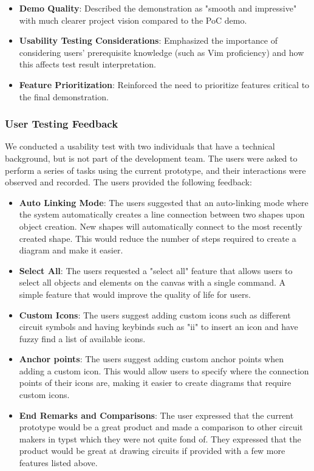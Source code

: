 \documentclass[12pt, titlepage]{article}
\begin{document}
\begin{itemize}
\item \textbf{Demo Quality}: Described the demonstration as "smooth and
  impressive" with much clearer project vision compared to the PoC
  demo.

\item \textbf{Usability Testing Considerations}: Emphasized the
  importance of considering users' prerequisite knowledge (such as Vim
  proficiency) and how this affects test result interpretation.

\item \textbf{Feature Prioritization}: Reinforced the need to prioritize
  features critical to the final demonstration.
\end{itemize}

\subsubsection{User Testing Feedback}
We conducted a usability test with two individuals that have a technical
background, but is not part of the development team. The users were
asked to perform a series of tasks using the current prototype,
and their interactions were observed and recorded.
The users provided the following feedback:

\begin{itemize}
\item \textbf{Auto Linking Mode}: The users suggested that an auto-linking
mode where the system automatically creates a line connection between two
shapes upon object creation. New shapes will automatically connect to the
most recently created shape. This would reduce the number of steps required
to create a diagram and make it easier.

\item \textbf{Select All}: The users requested a "select all" feature that
allows users to select all objects and elements on the canvas with a single
command. A simple feature that would improve the quality of life for users.

\item \textbf{Custom Icons}: The users suggest adding custom icons such as
different circuit symbols and having keybinds such as "ii" to insert an icon
and have fuzzy find a list of available icons.

\item \textbf{Anchor points}: The users suggest adding custom anchor points
when adding a custom icon. This would allow users to specify where the connection
points of their icons are, making it easier to create diagrams that
require custom icons.

\item \textbf{End Remarks and Comparisons}: The user expressed that the current
prototype would be a great product and made a comparison to other circuit makers
in typst which they were not quite fond of. They expressed that the product would
be great at drawing circuits if provided with a few more features listed above.
\end{itemize}
\end{document}
